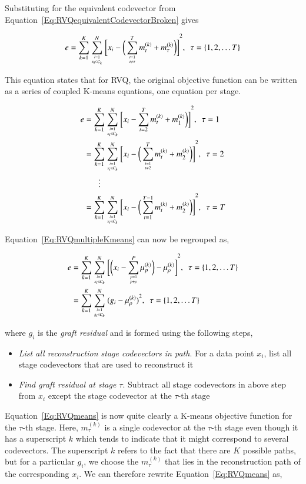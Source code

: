 Substituting for the equivalent codevector from Equation~\ref{Eq:RVQequivalentCodevectorBroken} gives

\begin{equation}
e=\KmeansSum{\bigg[\RVQmultipleKmeans\bigg]}^2, \ \ \tau=\{1, 2, \ldots T\}
\label{Eq:RVQmultipleKmeans}
\end{equation}

This equation states that for RVQ, the original objective function can be written as a series of coupled K-means equations, one equation per stage.    
 
\begin{align}
e&= \KmeansSum{\bigg[\RVQmultipleKmeansone\bigg]}^2, \ \ \tau=1\notag\\
&= \KmeansSum{\bigg[\RVQmultipleKmeanstwo\bigg]}^2, \ \ \tau=2\notag\\
&\ \ \ \  \ \ \ \vdots\notag\\
&=\KmeansSum{\bigg[\RVQmultipleKmeansT\bigg]}^2, \ \ \tau=T
\end{align}

Equation~\ref{Eq:RVQmultipleKmeans} can now be regrouped as,

\begin{align}
\label{Eq:RVQmeans}
e&= \KmeansSum{\bigg[\RVQmultipleKmeansonealternate\bigg]}^2, \ \ \tau=\{1, 2, \ldots T\}\notag\\
&={\RVQerroralternate}, \ \ \tau=\{1, 2, \ldots T\}
\end{align}

where $g_i$ is the \emph{graft residual} and is formed using the following steps,

\begin{itemize}
\item \emph{List all reconstruction stage codevectors in path}.  For a data point $x_i$, list all stage codevectors that are used to reconstruct it
\item \emph{Find graft residual at stage $\tau$}.  Subtract all stage codevectors in above step from $x_i$ except the stage codevector at the $\tau$-th stage  
 \end{itemize}

Equation~\ref{Eq:RVQmeans} is now quite clearly a K-means objective function for the $\tau$-th stage.  Here, $m_{\tau}^{(k)}$ is a single codevector at the $\tau$-th stage even though it has a superscript $k$ which tends to indicate that it might correspond to several codevectors.  The superscript $k$ refers to the fact that there are $K$ possible paths, but for a particular $g_i$, we choose the $m_{\tau}^{(k)}$ that lies in the reconstruction path of the corresponding $x_i$.  We can therefore rewrite Equation~\ref{Eq:RVQmeans} as,

